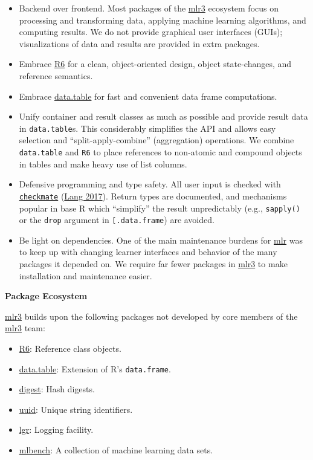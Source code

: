 \documentclass[
]{scrbook}
\providecommand{\tightlist}{%
  \setlength{\itemsep}{0pt}\setlength{\parskip}{0pt}}
\begin{document}
\begin{itemize}
\tightlist
\item
  Backend over frontend.
  Most packages of the \href{https://mlr3.mlr-org.com}{mlr3} ecosystem focus on processing and transforming data, applying machine learning algorithms, and computing results.
  We do not provide graphical user interfaces (GUIs); visualizations of data and results are provided in extra packages.
\item
  Embrace \href{https://cran.r-project.org/package=R6}{R6} for a clean, object-oriented design, object state-changes, and reference semantics.
\item
  Embrace \href{https://cran.r-project.org/package=data.table}{data.table} for fast and convenient data frame computations.
\item
  Unify container and result classes as much as possible and provide result data in \texttt{data.table}s.
  This considerably simplifies the API and allows easy selection and ``split-apply-combine'' (aggregation) operations.
  We combine \texttt{data.table} and \texttt{R6} to place references to non-atomic and compound objects in tables and make heavy use of list columns.
\item
  Defensive programming and type safety.
  All user input is checked with \href{https://cran.r-project.org/package=checkmate}{\texttt{checkmate}} (\protect\hyperlink{ref-checkmate}{Lang 2017}).
  Return types are documented, and mechanisms popular in base R which ``simplify'' the result unpredictably (e.g., \texttt{sapply()} or the \texttt{drop} argument in \texttt{{[}.data.frame}) are avoided.
\item
  Be light on dependencies.
  One of the main maintenance burdens for \href{https://mlr.mlr-org.com}{mlr} was to keep up with changing learner interfaces and behavior of the many packages it depended on.
  We require far fewer packages in \href{https://mlr3.mlr-org.com}{mlr3} to make installation and maintenance easier.
\end{itemize}

\textbf{Package Ecosystem}

\href{https://mlr3.mlr-org.com}{mlr3} builds upon the following packages not developed by core members of the \href{https://mlr3.mlr-org.com}{mlr3} team:

\begin{itemize}
\tightlist
\item
  \href{https://cran.r-project.org/package=R6}{R6}:
  Reference class objects.
\item
  \href{https://cran.r-project.org/package=data.table}{data.table}:
  Extension of R's \texttt{data.frame}.
\item
  \href{https://cran.r-project.org/package=digest}{digest}:
  Hash digests.
\item
  \href{https://cran.r-project.org/package=uuid}{uuid}:
  Unique string identifiers.
\item
  \href{https://cran.r-project.org/package=lgr}{lgr}:
  Logging facility.
\item
  \href{https://cran.r-project.org/package=mlbench}{mlbench}:
  A collection of machine learning data sets.
\end{itemize}
\end{document}
